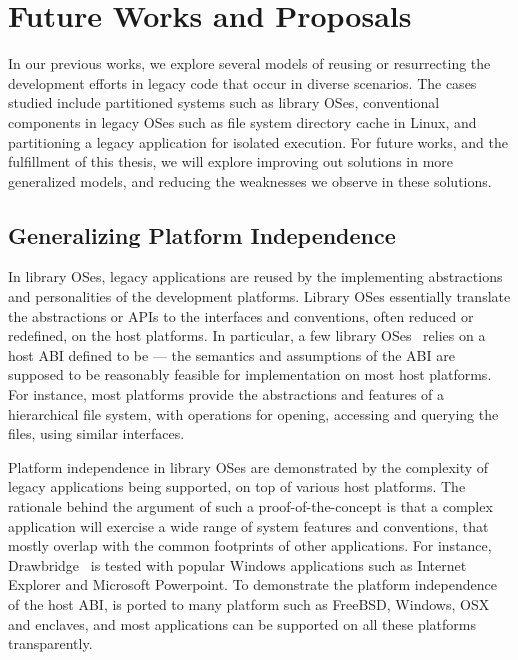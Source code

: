 \chapter{Future Works and Proposals}
\label{chap:future}

In our previous works, we explore several models of
reusing or resurrecting the development efforts in legacy code
that occur in diverse scenarios.
The cases studied include
partitioned systems such as library OSes,
conventional components in legacy OSes such as file system directory cache in Linux,
and partitioning a legacy \java{} application for isolated execution.
For future works, and the fulfillment of this thesis,
we will explore improving out solutions in more generalized models,
and reducing the weaknesses we observe in these solutions.



\section{Generalizing Platform Independence}
\label{sec:future:independence}

In library OSes, legacy applications are reused
by the \picoprocs{} implementing abstractions and personalities of the development platforms.
Library OSes essentially translate the abstractions or APIs
to the interfaces and conventions, often reduced or redefined, on the host platforms.
In particular, a few library OSes~\citep{porter11drawbridge, baumann13bascule, baumann14haven, tsai14graphene}
relies on a host ABI defined to be 
--- the semantics and assumptions of the ABI are supposed to be
reasonably feasible for implementation
on most host platforms.
For instance, most platforms provide the abstractions and features
of a hierarchical file system,
with operations for opening,
accessing and querying the files,
using similar interfaces.


Platform independence in library OSes are demonstrated by the complexity of legacy applications being supported,
on top of various host platforms.
The rationale behind the argument of such a proof-of-the-concept is that
a complex application will exercise a wide range of system features and conventions,
that mostly overlap with the common footprints of other applications.
For instance, Drawbridge~\cite{porter11drawbridge} is tested with
popular Windows applications such as Internet Explorer and Microsoft Powerpoint.
To demonstrate the platform independence of the host ABI,
\graphene{} is ported to many platform such as FreeBSD, Windows, OSX and \intel{} \sgx{} enclaves,
and most applications can be supported on all these platforms
transparently.

